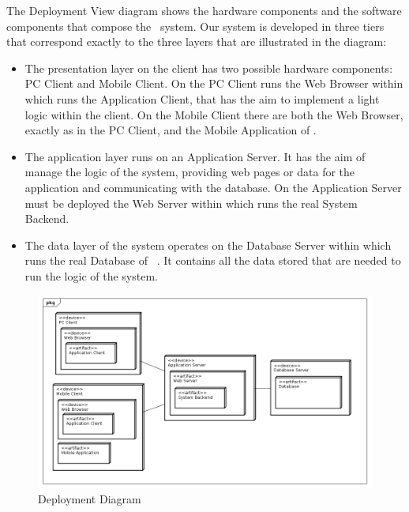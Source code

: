 The Deployment View diagram shows the hardware components and the software components that compose the \projectname~system. Our system is developed in three tiers that correspond exactly to the three layers that are illustrated in the diagram:
\begin{itemize}
	\item The presentation layer on the client has two possible hardware components: PC Client and Mobile Client. On the PC Client runs the Web Browser within which runs the Application Client, that has the aim to implement a light logic within the client. On the Mobile Client there are both the Web Browser, exactly as in the PC Client, and the Mobile Application of \projectname.
	\item The application layer runs on an Application Server. It has the aim of manage the logic of the system, providing web pages or data for the application and communicating with the database. On the Application Server must be deployed the Web Server within which runs the real System Backend.
	\item The data layer of the system operates on the Database Server within which runs the real Database of \projectname~. It contains all the data stored that are needed to run the logic of the system.
\end{itemize}


\begin{figure}[h]
\centering\includegraphics[width=\textwidth]{Images/UMLDiagrams/DeploymentDiagram.png}
\caption{Deployment Diagram}
\end{figure}

\clearpage